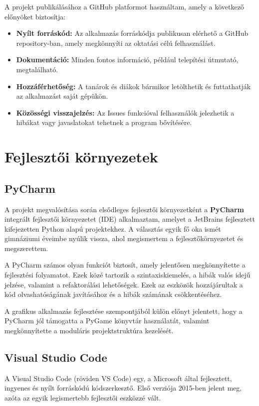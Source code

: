 \documentclass[]{thesis-ekf}
\begin{document}
	A projekt publikálásához a GitHub platformot használtam, amely a következő előnyöket biztosítja:
	\begin{itemize}
		\item \textbf{Nyílt forráskód:} Az alkalmazás forráskódja publikusan elérhető a GitHub repository-ban, amely megkönnyíti az oktatási célú felhasználást.
		\item \textbf{Dokumentáció:} Minden fontos információ, például telepítési útmutató, megtalálható.
		\item \textbf{Hozzáférhetőség:} A tanárok és diákok bármikor letölthetik és futtathatják az alkalmazást saját gépükön.
		\item \textbf{Közösségi visszajelzés:} Az Issues funkcióval felhasználók jelezhetik a hibákat vagy javaslatokat tehetnek a program bővítésére.
	\end{itemize}
	
	\section{Fejlesztői környezetek}
	\subsection{PyCharm}
	
	A projekt megvalósítása során elsődleges fejlesztői környezetként a \textbf{PyCharm}\cite{PyCharm} integrált fejlesztői környezetet (IDE) alkalmaztam, amelyet a JetBrains fejlesztett kifejezetten Python alapú projektekhez. A választás egyik fő oka ismét gimnáziumi éveimbe nyúlik vissza, ahol megismertem a fejlesztőkörnyezetet és megszerettem.
	
	A PyCharm számos olyan funkciót biztosít, amely jelentősen megkönnyítette a fejlesztési folyamatot. Ezek közé tartozik a szintaxiskiemelés, a hibák valós idejű jelzése, valamint a refaktorálási lehetőségek. Ezek az eszközök hozzájárultak a kód olvashatóságának javításához és a hibák számának csökkentéséhez.
	
	A grafikus alkalmazás fejlesztése szempontjából külön előnyt jelentett, hogy a PyCharm jól támogatta a PyGame\cite{PyGame} könyvtár használatát, valamint megkönnyítette a moduláris projektstruktúra kezelését.
	
	\subsection{Visual Studio Code}
	
	A Visual Studio Code (röviden VS Code) egy, a Microsoft által fejlesztett, ingyenes és nyílt forráskódú kódszerkesztő. Első verziója 2015-ben jelent meg, azóta az egyik legismertebb fejlesztői eszközzé vált.
	
\end{document}
